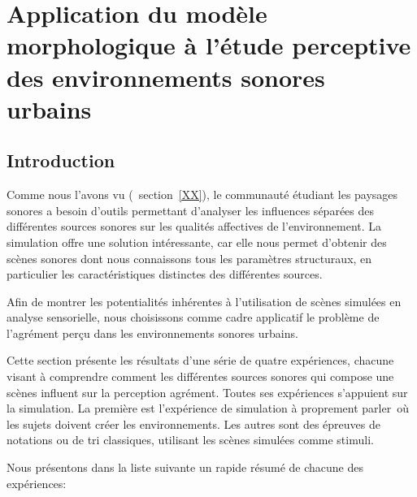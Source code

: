 \chapter[Application à l’étude perceptive des environnements sonores urbains]{Application du modèle morphologique à l’étude perceptive des environnements sonores urbains}\label{ch:psycho_xp}

\section{Introduction}

Comme nous l'avons vu (\Cf~section~\ref{XX}), le communauté étudiant les paysages sonores a besoin d'outils permettant d'analyser les influences séparées des différentes sources sonores sur les qualités affectives de l'environnement. La simulation offre une solution intéressante, car elle nous permet d'obtenir des scènes sonores dont nous connaissons tous les paramètres structuraux, en particulier les caractéristiques distinctes des différentes sources. 
 
Afin de montrer les potentialités inhérentes à l'utilisation de scènes simulées en analyse sensorielle, nous choisissons comme cadre applicatif le problème de l'agrément perçu dans les environnements sonores urbains. 

Cette section présente les résultats d'une série de quatre expériences, chacune visant à comprendre comment les différentes sources sonores qui compose une scènes influent sur la perception agrément. Toutes ses expériences s'appuient sur la simulation. La première est l'expérience de simulation à proprement parler\ie~où les sujets doivent créer les environnements. Les autres sont des épreuves de notations ou de tri classiques, utilisant les scènes simulées comme stimuli. 

Nous présentons dans la liste suivante un rapide résumé de chacune des expériences:

